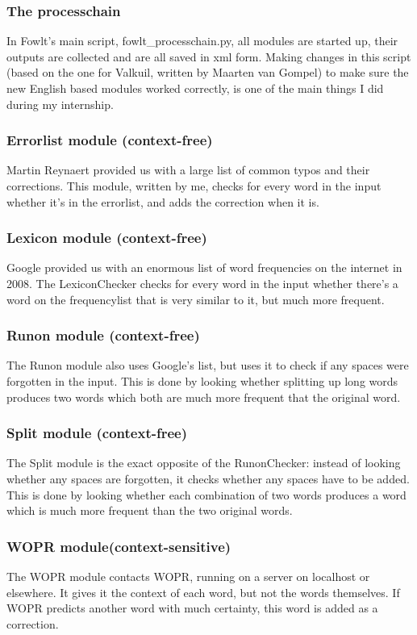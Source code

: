 \documentclass[12pt]{article}
\begin{document}
\subsubsection{The processchain}
In Fowlt's main script, fowlt\_processchain.py, all modules are started up, their outputs are collected and are all saved in xml form. Making changes in this script (based on the one for Valkuil, written by Maarten van Gompel) to make sure the new English based modules worked correctly, is one of the main things I did during my internship. 

\subsubsection{Errorlist module (context-free)}
Martin Reynaert provided us with a large list of common typos and their corrections. This module, written by me, checks for every word in the input whether it's in the errorlist, and adds the correction when it is.

\subsubsection{Lexicon module (context-free)}
Google provided us with an enormous list of word frequencies on the internet in 2008. The LexiconChecker checks for every word in the input whether there's a word on the frequencylist that is very similar to it, but much more frequent.

\subsubsection{Runon module (context-free)}
The Runon module also uses Google's list, but uses it to check if any spaces were forgotten in the input. This is done by looking whether splitting up long words produces two words which both are much more frequent that the original word.

\subsubsection{Split module (context-free)}
The Split module is the exact opposite of the RunonChecker: instead of looking whether any spaces are forgotten, it checks whether any spaces have to be added. This is done by looking whether each combination of two words produces a word which is much more frequent than the two original words.

\subsubsection{WOPR module(context-sensitive)}
The WOPR module contacts WOPR, running on a server on localhost or elsewhere. It gives it the context of each word, but not the words themselves. If WOPR predicts another word with much certainty, this word is added as a correction.  
\end{document}
